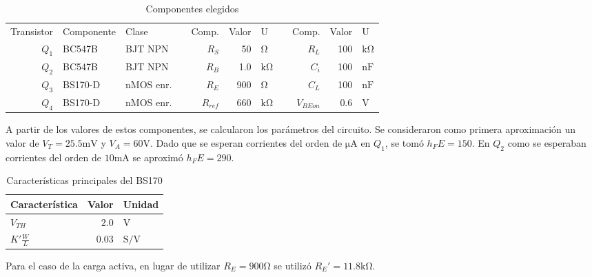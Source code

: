 \begin{table}[ht]
    \centering
    \begin{tabular}{|r|l|l|l|r|r|l|l|r|r|l|}
    \cline{1-3} \cline{5-7} \cline{9-11}
    Transistor & Componente & Clase       &  & Comp.      & Valor & U                &  & Comp. & Valor & U                  \\ \cline{1-3} \cline{5-7} \cline{9-11} 
    $Q_1$      & BC547B     & BJT NPN     &  & $R_S$      & 50   & $\si{\ohm}$ &  & $R_L$      & 100   & $\si{\kilo\ohm}$   \\
    $Q_2$      & BC547B     & BJT NPN     &  & $R_B$      & 1.0   & $\si{\kilo\ohm}$ &  & $C_i$      & 100   & $\si{\nano\farad}$ \\
    $Q_3$      & BS170-D    & nMOS enr.  &  & $R_E$      & 900   & $\si{\ohm}$ &  & $C_L$      & 100   & $\si{\nano\farad}$ \\
    $Q_4$      & BS170-D    & nMOS enr. &  & $R_{ref}$  & 660   & $\si{\kilo\ohm}$ &  &           $V_{BEon}$& 0.6   &   $\si{\volt}$  \\ \cline{1-3} \cline{5-7} \cline{9-11} 
    \end{tabular}
    \caption{Componentes elegidos}
\end{table}

A partir de los valores de estos componentes, se calcularon los parámetros del circuito. Se consideraron como primera aproximación un valor de $V_T = 25.5 \si{\milli\volt}$ y $V_A = 60 \si{\volt}$. Dado que se esperan corrientes del orden de $\si{\micro\ampere}$ en $Q_1$, se tomó $h_FE = 150$. En $Q_2$ como se esperaban corrientes del orden de $10\si{\milli\ampere}$ se aproximó $h_FE = 290$.

\begin{table}
    \centering
    \begin{tabular}{|l|r|l|}
        \hline
        Característica  &   Valor   &   Unidad  \\
        \hline
        $V_{TH}$    &   $2.0$   &   $\si{\volt}$    \\
        $K'\frac{W}{L}$&$0.03$  &   $\si{\siemens/\volt}$ \\
        \hline
    \end{tabular}
    \caption{Características principales del BS170}
\end{table}

Para el caso de la carga activa, en lugar de utilizar $R_E = 900\si{\ohm}$ se utilizó $R_E' = 11.8 \si{\kilo\ohm}$.

